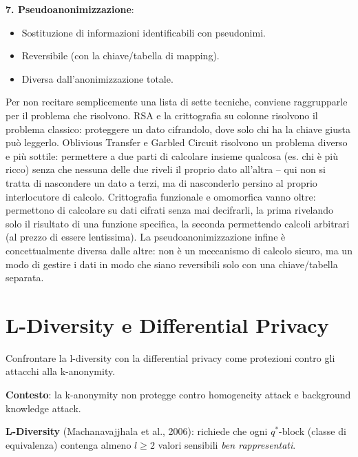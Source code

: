 \documentclass[a4paper,11pt]{article}
\begin{document}
\textbf{7. Pseudoanonimizzazione}:
\begin{itemize}
  \item Sostituzione di informazioni identificabili con pseudonimi.
  \item Reversibile (con la chiave/tabella di mapping).
  \item Diversa dall'anonimizzazione totale.
\end{itemize}

\begin{nota}
Per non recitare semplicemente una lista di sette tecniche, conviene raggrupparle per il problema che risolvono. RSA e la crittografia su colonne risolvono il problema classico: proteggere un dato cifrandolo, dove solo chi ha la chiave giusta pu\`{o} leggerlo. Oblivious Transfer e Garbled Circuit risolvono un problema diverso e pi\`{u} sottile: permettere a due parti di calcolare insieme qualcosa (es. chi \`{e} pi\`{u} ricco) senza che nessuna delle due riveli il proprio dato all'altra -- qui non si tratta di nascondere un dato a terzi, ma di nasconderlo persino al proprio interlocutore di calcolo. Crittografia funzionale e omomorfica vanno oltre: permettono di calcolare su dati cifrati senza mai decifrarli, la prima rivelando solo il risultato di una funzione specifica, la seconda permettendo calcoli arbitrari (al prezzo di essere lentissima). La pseudoanonimizzazione infine \`{e} concettualmente diversa dalle altre: non \`{e} un meccanismo di calcolo sicuro, ma un modo di gestire i dati in modo che siano reversibili solo con una chiave/tabella separata.
\end{nota}

\section{L-Diversity e Differential Privacy}

\begin{domanda}
Confrontare la l-diversity con la differential privacy come protezioni contro gli attacchi alla k-anonymity.
\end{domanda}

\textbf{Contesto}: la k-anonymity non protegge contro homogeneity attack e background knowledge attack.

\textbf{L-Diversity} (Machanavajjhala et al., 2006): richiede che ogni $q^*$-block (classe di equivalenza) contenga almeno $l \geq 2$ valori sensibili \emph{ben rappresentati}.
\end{document}

